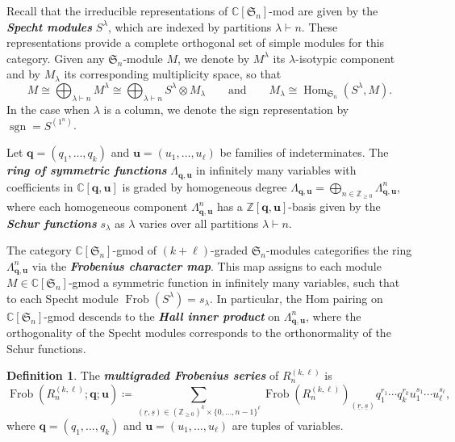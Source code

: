 \documentclass[11pt, reqno]{amsart}
\theoremstyle{definition}
\newtheorem{definition}[theorem]{Definition}
\theoremstyle{remark}
\numberwithin{equation}{section}
\newcommand{\0}{\emptyset}
\newcommand{\Z}{\mathbb{Z}}
\newcommand{\C}{\mathbb{C}}
\renewcommand{\S}{\mathfrak{S}}
\renewcommand{\r}{\underline{r}}
\newcommand{\s}{\underline{s}}
\DeclareMathOperator{\Frob}{Frob}
\DeclareMathOperator{\sgn}{sgn}
\DeclareMathOperator{\Hom}{Hom}
\newcommand{\newword}[1]{\emph{\textbf{#1}}}
\begin{document}
Recall that the irreducible representations of $\C[\S_n]$-mod are given by the \newword{Specht modules} $S^\lambda$, which are indexed by partitions $\lambda\vdash n$. These representations provide a complete orthogonal set of simple modules for this category. Given any $\S_n$-module $M$, we denote by $M^\lambda$ its $\lambda$-isotypic component and by $M_\lambda$ its corresponding multiplicity space, so that
\[
    M \cong \bigoplus_{\lambda \vdash n} M^\lambda \cong 
    \bigoplus_{\lambda \vdash n} S^\lambda \otimes M_\lambda 
    \qquad \text{and} \qquad
    M_\lambda \cong \Hom_{\S_n}(S^\lambda, M).
\]
In the case when $\lambda$ is a column, we denote the sign representation by $\sgn = S^{(1^n)}$.

Let $\mathbf{q} = (q_1,\ldots, q_k)$ and $\mathbf{u} = (u_1,\ldots, u_\ell)$ be families of indeterminates.
The \newword{ring of symmetric functions} $\Lambda_{\mathbf{q}, \mathbf{u}}$ in infinitely many variables with coefficients in $\C[\mathbf{q},\mathbf{u}]$ is graded by homogeneous degree $\Lambda_{\mathbf{q}, \mathbf{u}} = \bigoplus_{n \in \Z_{\geq0}} \Lambda_{\mathbf{q}, \mathbf{u}}^n$, where each homogeneous component $\Lambda_{\mathbf{q}, \mathbf{u}}^n$
has a $\Z[\mathbf{q},\mathbf{u}]$-basis given by the \newword{Schur functions} $s_\lambda$ as $\lambda$ varies over all partitions $\lambda \vdash n$. 

The category $\C[\S_n]$-gmod of $(k+\ell)$-graded $\S_n$-modules categorifies the ring $\Lambda_{\mathbf{q}, \mathbf{u}}^n$ via the \newword{Frobenius character map}.
This map assigns to each module $M \in \C[\S_n]$-gmod a symmetric function in infinitely many variables, such that to each Specht module $\Frob(S^\lambda) = s_\lambda$. In particular, the Hom pairing on $\C[\S_n]$-gmod descends to the 
\newword{Hall inner product} on $\Lambda_{\mathbf{q}, \mathbf{u}}^n$, where the orthogonality of the Specht modules corresponds to the orthonormality of the Schur functions.

\begin{definition}
    \label{defi:multigraded-hilbert-frobenius-series}
    The \newword{multigraded Frobenius series} of $R_n^{(k,\ell)}$ is 
    \[
        \Frob(R_n^{(k,\ell)}; \mathbf{q}; \mathbf{u}) \coloneqq 
        \sum_{(\r, \s) 
    \in (\mathbb{Z}_{\geq 0})^{k} \times \{0,\ldots,n-1\}^{\ell}}
        \Frob\left(R_n^{(k,\ell)}\right)_{(\r, \s)} 
        q_1^{r_1}\cdots q_k^{r_k} u_1^{s_1}\cdots u_\ell^{s_\ell}, 
    \]
    where $\mathbf{q} = (q_1, \ldots, q_k)$ and $\mathbf{u} = (u_1, \ldots, u_{\ell})$ are tuples of variables.
\end{definition}
\end{document}
